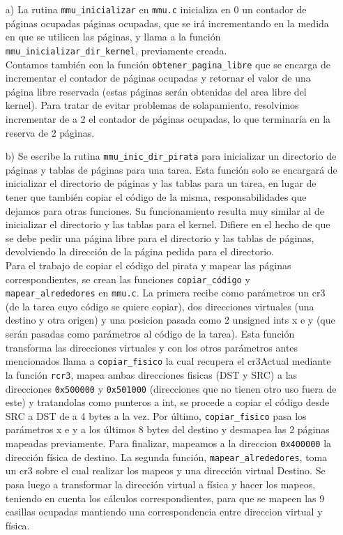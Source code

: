 \begin{enumerate}
\item[a)] La rutina {\tt mmu_inicializar} en {\tt mmu.c} inicializa en 0 un contador de páginas ocupadas p\'aginas ocupadas, que se ir\'a incrementando en la medida en que se utilicen las p\'aginas, y llama a la funci\'on {\tt mmu_inicializar_dir_kernel}, previamente creada.\\
Contamos también con la función {\tt obtener_pagina_libre} que se encarga de incrementar el contador de páginas ocupadas y retornar el valor de una página libre reservada (estas páginas serán obtenidas del area libre del kernel). Para tratar de evitar problemas de solapamiento, resolvimos incrementar de a 2 el contador de páginas ocupadas, lo que terminaría en la reserva de 2 páginas. 

\item[b)] Se escribe la rutina {\tt mmu_inic_dir_pirata} para inicializar un directorio de páginas y tablas de páginas para una tarea. Esta función solo se encargará de inicializar el directorio de páginas y las tablas para un tarea, en lugar de tener que también copiar el código de la misma, responsabilidades que dejamos para otras funciones. Su funcionamiento resulta muy similar al de inicializar el directorio y las tablas para el kernel. Difiere en el hecho de que se debe pedir una página libre para el directorio y las tablas de páginas, devolviendo la dirección de la página pedida para el directorio.\\

Para el trabajo de copiar el c\'odigo del pirata y mapear las p\'aginas correspondientes, se crean las funciones {\tt copiar\_código} y {\tt mapear\_alrededores} en {\tt mmu.c}. La primera recibe como parámetros un cr3 (de la tarea cuyo código se quiere copiar), dos direcciones virtuales (una destino y otra origen) y una posicion pasada como 2 unsigned ints x e y (que serán pasadas como parámetros al código de la tarea). Esta función transforma las direcciones virtuales y con los otros parámetros antes mencionados llama a {\tt copiar\_fisico} la cual recupera el cr3Actual mediante la función {\tt rcr3}, mapea ambas direcciones fisicas (DST y SRC) a las direcciones {\tt 0x500000} y {\tt 0x501000} (direcciones que no tienen otro uso fuera de este) y tratandolas como punteros a int, se procede a copiar el código desde SRC a DST de a 4 bytes a la vez. Por último, {\tt copiar\_fisico} pasa los parámetros x e y a los últimos 8 bytes del destino y desmapea las 2 páginas mapeadas previamente. Para finalizar, mapeamos a la direccion {\tt 0x400000} la dirección física de destino.
La segunda función, {\tt mapear\_alrededores}, toma un cr3 sobre el cual realizar los mapeos y una dirección virtual Destino. Se pasa luego a transformar la dirección virtual a física y hacer los mapeos, teniendo en cuenta los cálculos correspondientes, para que se mapeen las 9 casillas ocupadas mantiendo una correspondencia entre direccion virtual y física.


\end{enumerate}
